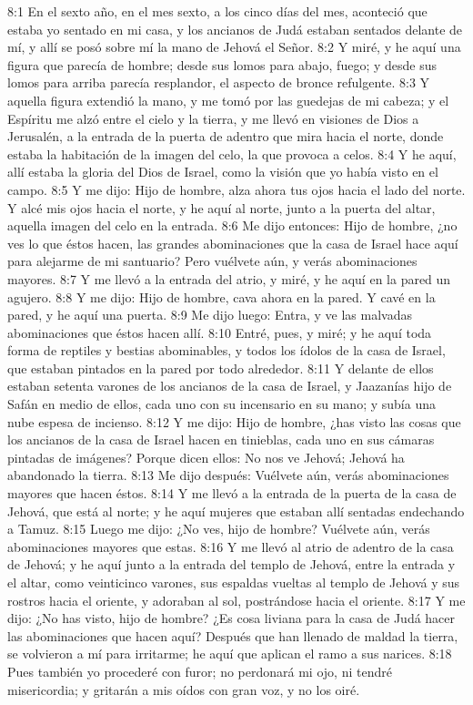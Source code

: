 8:1 En el sexto año, en el mes sexto, a los cinco días del mes, aconteció que estaba yo sentado en mi casa, y los ancianos de Judá estaban sentados delante de mí, y allí se posó sobre mí la mano de Jehová el Señor.   
8:2 Y miré, y he aquí una figura que parecía de hombre; desde sus lomos para abajo, fuego; y desde sus lomos para arriba parecía resplandor, el aspecto de bronce refulgente. 
8:3 Y aquella figura extendió la mano, y me tomó por las guedejas de mi cabeza; y el Espíritu me alzó entre el cielo y la tierra, y me llevó en visiones de Dios a Jerusalén, a la entrada de la puerta de adentro que mira hacia el norte, donde estaba la habitación de la imagen del celo, la que provoca a celos.   
8:4 Y he aquí, allí estaba la gloria del Dios de Israel, como la visión que yo había visto en el campo. 
8:5 Y me dijo: Hijo de hombre, alza ahora tus ojos hacia el lado del norte. Y alcé mis ojos hacia el norte, y he aquí al norte, junto a la puerta del altar, aquella imagen del celo en la entrada.   
8:6 Me dijo entonces: Hijo de hombre, ¿no ves lo que éstos hacen, las grandes abominaciones que la casa de Israel hace aquí para alejarme de mi santuario? Pero vuélvete aún, y verás abominaciones mayores.   
8:7 Y me llevó a la entrada del atrio, y miré, y he aquí en la pared un agujero.   
8:8 Y me dijo: Hijo de hombre, cava ahora en la pared. Y cavé en la pared, y he aquí una puerta.   
8:9 Me dijo luego: Entra, y ve las malvadas abominaciones que éstos hacen allí.   
8:10 Entré, pues, y miré; y he aquí toda forma de reptiles y bestias abominables, y todos los ídolos de la casa de Israel, que estaban pintados en la pared por todo alrededor.   
8:11 Y delante de ellos estaban setenta varones de los ancianos de la casa de Israel, y Jaazanías hijo de Safán en medio de ellos, cada uno con su incensario en su mano; y subía una nube espesa de incienso.   
8:12 Y me dijo: Hijo de hombre, ¿has visto las cosas que los ancianos de la casa de Israel hacen en tinieblas, cada uno en sus cámaras pintadas de imágenes? Porque dicen ellos: No nos ve Jehová; Jehová ha abandonado la tierra.   
8:13 Me dijo después: Vuélvete aún, verás abominaciones mayores que hacen éstos.   
8:14 Y me llevó a la entrada de la puerta de la casa de Jehová, que está al norte; y he aquí mujeres que estaban allí sentadas endechando a Tamuz.   
8:15 Luego me dijo: ¿No ves, hijo de hombre? Vuélvete aún, verás abominaciones mayores que estas.   
8:16 Y me llevó al atrio de adentro de la casa de Jehová; y he aquí junto a la entrada del templo de Jehová, entre la entrada y el altar, como veinticinco varones, sus espaldas vueltas al templo de Jehová y sus rostros hacia el oriente, y adoraban al sol, postrándose hacia el oriente.   
8:17 Y me dijo: ¿No has visto, hijo de hombre? ¿Es cosa liviana para la casa de Judá hacer las abominaciones que hacen aquí? Después que han llenado de maldad la tierra, se volvieron a mí para irritarme; he aquí que aplican el ramo a sus narices.   
8:18 Pues también yo procederé con furor; no perdonará mi ojo, ni tendré misericordia; y gritarán a mis oídos con gran voz, y no los oiré.   
